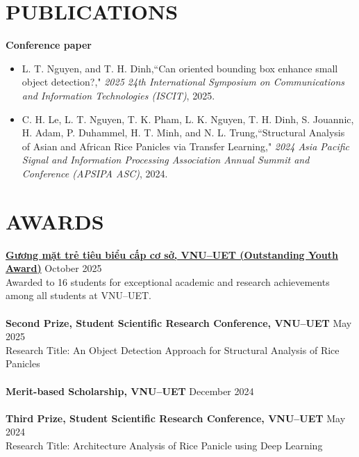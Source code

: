 \documentclass[a4paper,9pt]{extarticle}
\newcommand{\colormyname}[1]{\textcolor{myred}{#1}}
\begin{document}

\section*{PUBLICATIONS}

\noindent
\textbf{Conference paper}
\begin{itemize}[itemsep=3pt]
    \item \colormyname{L. T. Nguyen}, and T. H. Dinh,``Can oriented bounding box enhance small object detection?," \textit{2025 24th International Symposium on Communications and Information Technologies (ISCIT)}, 2025.
    \item C. H. Le, \colormyname{L. T. Nguyen}, T. K. Pham, L. K. Nguyen, T. H. Dinh, S. Jouannic, H. Adam, P. Duhammel, H. T. Minh, and N. L. Trung,``Structural Analysis of Asian and African Rice Panicles via Transfer Learning," \textit{2024 Asia Pacific Signal and Information Processing Association Annual Summit and Conference (APSIPA ASC)}, 2024.
\end{itemize}

\section*{AWARDS}
\textbf{\href{https://github.com/lam-thai-nguyen/lam-thai-nguyen.github.io/blob/main/resources/docs/outstanding-youth-award-oct-2025-vnu-uet.pdf}{Gương mặt trẻ tiêu biểu cấp cơ sở, VNU--UET (Outstanding Youth Award)}} \hfill October 2025\\
Awarded to 16 students for exceptional academic and research achievements among all students at VNU--UET.\\ \\
\textbf{Second Prize, Student Scientific Research Conference, VNU--UET} \hfill May 2025\\ 
Research Title: An Object Detection Approach for Structural Analysis of Rice Panicles \\ \\
\textbf{Merit-based Scholarship, VNU--UET} \hfill  December 2024 \\ \\
\textbf{Third Prize, Student Scientific Research Conference, VNU--UET} \hfill May 2024\\ 
Research Title: Architecture Analysis of Rice Panicle using Deep Learning 
\end{document}
